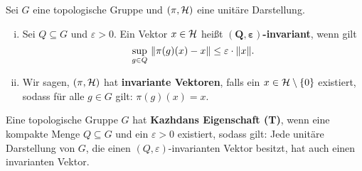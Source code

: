 \begin{definition}
	Sei $G$ eine topologische Gruppe und $(\pi,\mathcal{H})$ eine unitäre Darstellung.
	\begin{enumerate}[(i)]
		\item Sei $Q \subseteq G$ und $\varepsilon > 0$. Ein Vektor $x \in \mathcal{H}$ heißt $\bm{(Q,\varepsilon)}$\textbf{-invariant}, wenn gilt
		\[
			\sup_{g \in Q} \ \lVert\pi(g)(x) - x\rVert \le \varepsilon \cdot \lVert x\rVert.
		\]
		\item Wir sagen, $(\pi,\mathcal{H})$ hat \textbf{invariante Vektoren}, falls ein $x \in \mathcal{H} \setminus \{0\}$ existiert, sodass für alle $g \in G$ gilt: $\pi(g)(x) = x$.
	\end{enumerate}
\end{definition}

\begin{definition}
	Eine topologische Gruppe $G$ hat \textbf{Kazhdans Eigenschaft (T)}, wenn eine kompakte Menge $Q \subseteq G$ und ein $\varepsilon > 0$ existiert, sodass gilt: Jede unitäre Darstellung von $G$, die einen $(Q,\varepsilon)$-invarianten Vektor besitzt, hat auch einen invarianten Vektor.
\end{definition}

\cleardoubleoddemptypage